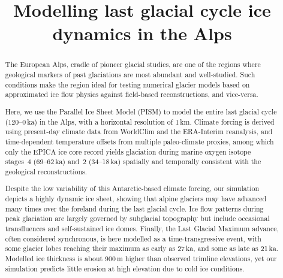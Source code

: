 \documentclass[tc, manuscript]{copernicus}
\title{Modelling last glacial cycle ice dynamics in the Alps}
\affil[1]{Laboratory of Hydraulics, Hydrology and Glaciology,
          ETH Zürich, Switzerland}
\affil[2]{Institute of Earth and Environmental Sciences,
          University of Freiburg, Germany}
\begin{document}


\maketitle

\begin{abstract}

    The European Alps, cradle of pioneer glacial studies, are one of the
    regions where geological markers of past glaciations are most abundant and
    well-studied. Such conditions make the region ideal for testing numerical
    glacier models based on approximated ice flow physics against field-based
    reconstructions, and vice-versa.

    Here, we use the Parallel Ice Sheet Model (PISM) to model the entire last
    glacial cycle (120--0\,ka) in the Alps, with a horizontal resolution of
    1\,km. Climate forcing is derived using present-day climate data from
    WorldClim and the ERA-Interim reanalysis, and time-dependent temperature
    offsets from multiple paleo-climate proxies, among which only the EPICA ice
    core record yields glaciation during marine oxygen isotope stages~4
    (69--62\,ka) and~2 (34--18\,ka) spatially and temporally consistent with
    the geological reconstructions.

    Despite the low variability of this Antarctic-based climate forcing, our
    simulation depicts a highly dynamic ice sheet, showing that alpine glaciers
    may have advanced many times over the foreland during the last glacial
    cycle. Ice flow patterns during peak glaciation are largely governed by
    subglacial topography but include occasional transfluences and
    self-sustained ice domes. Finally, the Last
    Glacial Maximum advance, often considered synchronous, is here modelled as
    a time-transgressive event, with some glacier lobes reaching their maximum
    as early as 27\,ka, and some as late as 21\,ka. Modelled ice thickness is
    about 900\,m higher than observed trimline elevations, yet our simulation
    predicts little erosion at high elevation due to cold ice conditions.

\end{abstract}



\introduction
\label{sec:intro}
\end{document}
